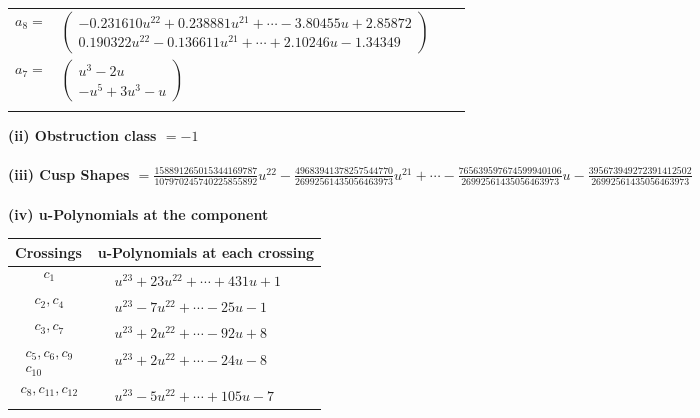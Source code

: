 \documentclass[1p]{elsarticle_modified}
\theoremstyle{definition}
\begin{document}
\begin{tabular}{m{7pt} m{180pt} m{7pt} m{180pt} }
\flushright $a_{8}=$&$\begin{pmatrix}-0.231610 u^{22}+0.238881 u^{21}+\cdots-3.80455 u+2.85872\\0.190322 u^{22}-0.136611 u^{21}+\cdots+2.10246 u-1.34349\end{pmatrix}$ \\
\flushright $a_{7}=$&$\begin{pmatrix}u^3-2 u\\- u^5+3 u^3- u\end{pmatrix}$\\&\end{tabular}
\flushleft \textbf{(ii) Obstruction class $= -1$}\\~\\
\flushleft \textbf{(iii) Cusp Shapes $= \frac{158891265015344169787}{107970245740225855892} u^{22}-\frac{49683941378257544770}{26992561435056463973} u^{21}+\cdots-\frac{765639597674599940106}{26992561435056463973} u-\frac{395673949272391412502}{26992561435056463973}$}\\~\\
\newpage\renewcommand{\arraystretch}{1}
\flushleft \textbf{(iv) u-Polynomials at the component}\newline \\
\begin{tabular}{m{50pt}|m{274pt}}
Crossings & \hspace{64pt}u-Polynomials at each crossing \\
\hline $$\begin{aligned}c_{1}\end{aligned}$$&$\begin{aligned}
&u^{23}+23 u^{22}+\cdots+431 u+1
\end{aligned}$\\
\hline $$\begin{aligned}c_{2},c_{4}\end{aligned}$$&$\begin{aligned}
&u^{23}-7 u^{22}+\cdots-25 u-1
\end{aligned}$\\
\hline $$\begin{aligned}c_{3},c_{7}\end{aligned}$$&$\begin{aligned}
&u^{23}+2 u^{22}+\cdots-92 u+8
\end{aligned}$\\
\hline $$\begin{aligned}c_{5},c_{6},c_{9}\\c_{10}\end{aligned}$$&$\begin{aligned}
&u^{23}+2 u^{22}+\cdots-24 u-8
\end{aligned}$\\
\hline $$\begin{aligned}c_{8},c_{11},c_{12}\end{aligned}$$&$\begin{aligned}
&u^{23}-5 u^{22}+\cdots+105 u-7
\end{aligned}$\\
\hline
\end{tabular}\\~\\
\end{document}
